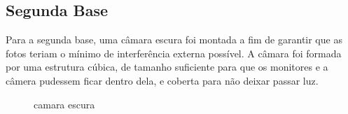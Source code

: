 \subsection{Segunda Base}

Para a segunda base, uma câmara escura foi montada a fim de garantir que as fotos teriam o mínimo de interferência externa possível. A câmara foi formada por uma estrutura cúbica, de tamanho suficiente para que os monitores e a câmera pudessem ficar dentro dela, e coberta para não deixar passar luz.

\begin{figure}
 \centering
  \hfill
  \caption{camara escura}
  \label{camaraescura}
\end{figure}





